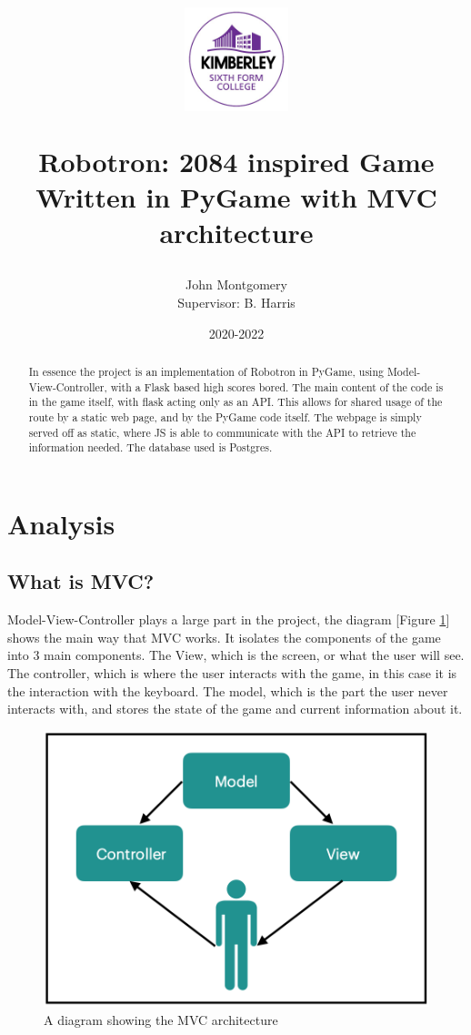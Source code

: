 \documentclass{article}
\title{%
    
    \begin{center}
        \includegraphics[width=3cm]{kimberley.png}
        \centering
    \end{center}
  Robotron: 2084 inspired Game \\
  \large Written in PyGame with MVC architecture}
\author{John Montgomery\\ {\small Supervisor: B. Harris}}
\date{2020-2022}
\begin{document}
\maketitle
\begin{abstract}
    In essence the project is an implementation of Robotron in PyGame, using Model-View-Controller, with a Flask based high scores bored. The main content of the code is in the game itself, with flask acting only as an API. This allows for shared usage of the route by a static web page, and by the PyGame code itself. The webpage is simply served off as static, where JS is able to communicate with the API to retrieve the information needed. The database used is Postgres. 
\end{abstract}
\newpage
\tableofcontents
\newpage
\listoffigures
\newpage
\section{Analysis}
\subsection{What is MVC?}
Model-View-Controller plays a large part in the project, the diagram [Figure \ref{fig:MVC_overview}] shows the main way that MVC works. It isolates the components of the game into 3 main components. The View, which is the screen, or what the user will see. The controller, which is where the user interacts with the game, in this case it is the interaction with the keyboard. The model, which is the part the user never interacts with, and stores the state of the game and current information about it.

\begin{figure}[h]
  \includegraphics[width=\linewidth]{MVC overview.png}
  \caption{A diagram showing the MVC architecture}
  \label{fig:MVC_overview}
\end{figure}
\end{document}
